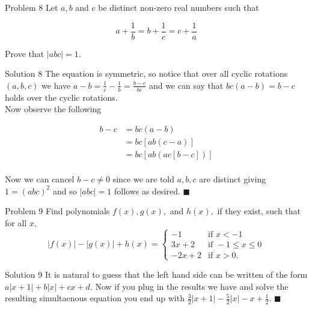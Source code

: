 \documentclass{article}
\begin{document}
\begin{problem}{Problem 8}
Let $a, b$ and $c$ be distinct non-zero real numbers such that

$$
a + \frac{1}{b} = b + \frac{1}{c} = c + \frac{1}{a}
$$

Prove that $|abc| = 1$.
\end{problem}

\begin{solution}{Solution 8}
The equation is symmetric, so notice that over all cyclic rotations
$(a,b,c)$ we have $a-b = \frac{1}{c} - \frac{1}{b} = \frac{b-c}{bc}$ and
we can say that $bc(a-b) = b-c$ holds over the cyclic rotations. \\

Now observe the following

\[
\begin{aligned}
b-c &= bc(a-b) \\
&= bc\left[ ab(c-a) \right] \\
&= bc\left[ ab( ac \left[ b-c \right] ) \right] \\
\end{aligned}
\]

Now we can cancel $b-c \neq 0$ since we are told $a,b,c$ are distinct
giving $1 = (abc)^2$ and so $|abc| = 1$ follows as desired. $\blacksquare$

\end{solution}

\vspace{0.2cm}

\begin{problem}{Problem 9}
Find polynomials \( f(x), g(x), \) and \( h(x), \) if they exist, such that for all \( x, \)
\[
|f(x)| - |g(x)| + h(x) =
\begin{cases}
-1 & \text{if } x < -1 \\
3x + 2 & \text{if } -1 \leq x \leq 0 \\
-2x + 2 & \text{if } x > 0.
\end{cases}
\]
\end{problem}

\begin{solution}{Solution 9}
It is natural to guess that the left hand side can be written of the form
$a|x+1| + b|x| + cx + d$. Now if you plug in the results we have and solve
the resulting simultaenous equation you end up with
$\frac{3}{2}|x+1| - \frac{5}{2}|x| - x + \frac{1}{2}$. $\blacksquare$
\end{solution}

\vspace{0.2cm}
\end{document}
